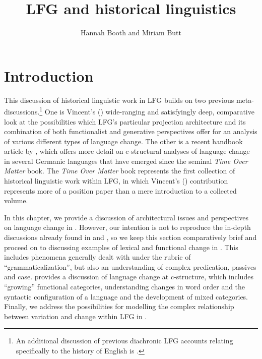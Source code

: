 \documentclass[output=paper,hidelinks]{langscibook}
\title{LFG and historical linguistics}
\author{Hannah Booth\affiliation{Ghent University}   and   Miriam Butt\affiliation{University of Konstanz}}
\begin{document}
\maketitle
\label{chap:Historical}

\section{Introduction}
\label{sec:Historical:intro}
\largerpage[-1]
This discussion of historical linguistic work in LFG builds on two previous meta-discussions.\footnote{An additional discussion of previous diachronic LFG accounts relating specifically to the history of English is \citet{Allen2012}.} One is Vincent's (\citeyear{vincent2001lfg})  wide-ranging and satisfyingly deep, comparative look at the possibilities which LFG's particular projection architecture and its combination of both functionalist and generative perspectives offer for an analysis of various different types of language change. The other is a recent handbook article by \citet{borjars2017lexical}, which  offers more detail on c-structural analyses of language change in several Germanic languages that have emerged since the seminal \textit{Time Over Matter} book. The \textit{Time Over Matter} book  \citep{ButtKing01}  represents the first collection of historical linguistic work within LFG, in which Vincent's (\citeyear{vincent2001lfg}) contribution represents more of a position paper than a mere introduction to a collected volume. 

In this chapter, we provide a discussion of architectural issues and perspectives on language change in . However, our intention is not to reproduce  the in-depth discussions already found in \citet{vincent2001lfg} and \citet{borjars2017lexical}, so we keep this section comparatively brief and proceed on to discussing examples of lexical and functional change in .  This includes phenomena generally dealt with under the rubric of ``grammaticalization'', but also an understanding of complex predication, passives and case.  provides a discussion of language change at c-structure, which includes ``growing'' functional categories, understanding changes in word order and the syntactic configuration of a language and the development of mixed categories. Finally, we address the possibilities for modelling the complex relationship between variation and change within LFG in .
\end{document}
